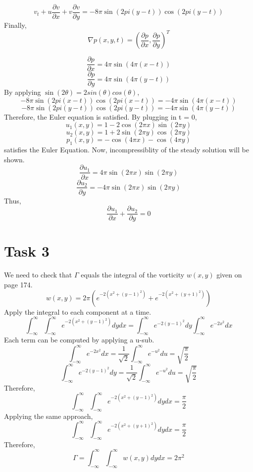\documentclass{article}
\begin{document}
$$v_t + u\frac{\partial v}{\partial x} + v\frac{\partial v}{\partial y} = -8\pi\sin(2pi(y-t))\cos(2pi(y - t))$$
Finally, 
$$\nabla p(x, y, t) = (\frac{\partial p}{\partial x}, \frac{\partial p}{\partial y})^T$$

$$\frac{\partial p}{\partial x} = 4\pi\sin(4\pi(x-t))$$
$$\frac{\partial p}{\partial y} = 4\pi\sin(4\pi(y-t))$$
By applying $\sin(2\theta) = 2sin(\theta)cos(\theta)$, 
$$-8\pi\sin(2pi(x-t))\cos(2pi(x - t)) = -4\pi\sin(4\pi(x-t))$$
$$-8\pi\sin(2pi(y-t))\cos(2pi(y - t)) = -4\pi\sin(4\pi(y-t))$$
Therefore, the Euler equation is satisfied. By plugging in t = 0,
$$u_1(x, y) = 1 - 2\cos(2\pi x)\sin(2\pi y)$$
$$u_2(x, y) = 1 + 2\sin(2\pi y)\cos(2\pi y)$$
$$p_1(x, y) = -\cos(4\pi x) - \cos(4\pi y)$$
satisfies the Euler Equation. 
Now, incompressiblity of the steady solution will be shown. 
$$\frac{\partial u_1}{\partial x} = 4\pi\sin(2\pi x)\sin(2\pi y)$$
$$\frac{\partial u_2}{\partial y} = -4\pi\sin(2\pi x)\sin(2\pi y)$$
Thus, $$\frac{\partial u_1}{\partial x} + \frac{\partial u_2}{\partial y} = 0$$


\section*{Task 3}
We need to check that $\Gamma$ equals the integral of the vorticity $w(x, y)$ given on page 174.
$$w(x, y) = 2\pi(e^{-2(x^2 + (y-1)^2)} + e^{-2(x^2 + (y+1)^2)} )$$
Apply the integral to each component at a time.
$$\int_{-\infty}^{\infty}\int_{-\infty}^{\infty}e^{-2(x^2 + (y-1)^2)}dydx = \int_{-\infty}^{\infty} e^{-2(y-1)^2}dy\int_{-\infty}^{\infty} e^{-2x^2}dx$$
Each term can be computed by applying a u-sub.
$$\int_{-\infty}^{\infty} e^{-2x^2}dx = \frac{1}{\sqrt{2}} \int_{-\infty}^{\infty}e^{-u^2}du = \sqrt{\frac{\pi}{2}}$$
$$\int_{-\infty}^{\infty} e^{-2(y-1)^2}dy = \frac{1}{\sqrt{2}} \int_{-\infty}^{\infty}e^{-u^2}du = \sqrt{\frac{\pi}{2}}$$
Therefore,
$$\int_{-\infty}^{\infty}\int_{-\infty}^{\infty}e^{-2(x^2 + (y-1)^2)}dydx = \frac{\pi}{2}$$
Applying the same approach,
$$\int_{-\infty}^{\infty}\int_{-\infty}^{\infty}e^{-2(x^2 + (y+1)^2)}dydx = \frac{\pi}{2}$$
Therefore,
$$\Gamma = \int_{-\infty}^{\infty}\int_{-\infty}^{\infty} w(x, y)dydx = 2\pi^2$$
\end{document}
